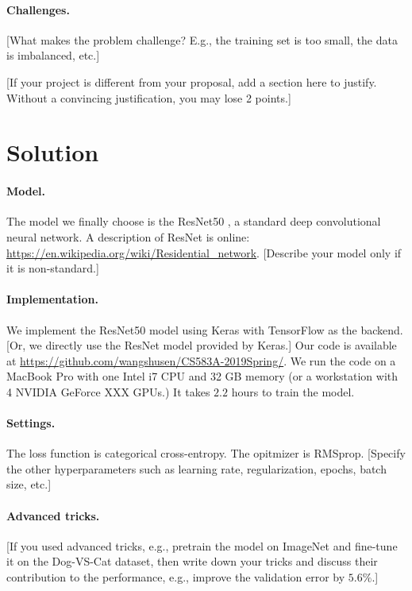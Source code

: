\documentclass[11pt]{article}
\numberwithin{equation}{section}
\begin{document}
\paragraph{Challenges.}
[What makes the problem challenge? E.g., the training set is too small, the data is imbalanced, etc.]



[If your project is different from your proposal, add a section here to justify. Without a convincing justification, you may lose 2 points.]


\section{Solution}

\paragraph{Model.}
The model we finally choose is the ResNet50 \cite{he2016deep}, a standard deep convolutional neural network.
A description of ResNet is online: \url{https://en.wikipedia.org/wiki/Residential_network}.
[Describe your model only if it is non-standard.]


\paragraph{Implementation.}
We implement the ResNet50 model using Keras with TensorFlow as the backend. [Or, we directly use the ResNet model provided by Keras.]
Our code is available at \url{https://github.com/wangshusen/CS583A-2019Spring/}.
We run the code on a MacBook Pro with one Intel i7 CPU and 32 GB memory (or a workstation with 4 NVIDIA GeForce XXX GPUs.)
It takes $2.2$ hours to train the model.


\paragraph{Settings.}
The loss function is categorical cross-entropy.
The opitmizer is RMSprop.
[Specify the other hyperparameters such as learning rate, regularization, epochs, batch size, etc.]


\paragraph{Advanced tricks.}
[If you used advanced tricks, e.g., pretrain the model on ImageNet and fine-tune it on the Dog-VS-Cat dataset, then write down your tricks and discuss their contribution to the performance, e.g., improve the validation error by $5.6\%$.]
\end{document}
